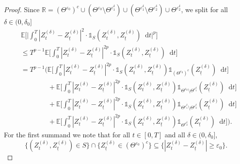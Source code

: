 \documentclass[11pt,a4paper]{article}
\numberwithin{equation}{section}
\theoremstyle{definition}
\newcommand{\E}{{\mathbb{E}}}
\newcommand{\R}{{\mathbb{R}}}
\newcommand{\diff}{\mathop{}\!\mathrm{d}}
\begin{document}
\begin{proof}
    Since $\R = (\Theta^{\varepsilon_0})^c \cup (\Theta^{\varepsilon_0}\setminus \Theta^{\varepsilon_1^\delta}) \cup (\Theta^{\varepsilon_1^\delta}\setminus \Theta^{\varepsilon_2^\delta}) \cup \Theta^{\varepsilon_2^\delta}$, we split for all $\delta\in(0,\delta_0]$
    \begin{equation}
        \begin{aligned}
            &\E\Big[\Big|\int_0^T |Z_{t}^{(\delta)} - Z_{\underline t}^{(\delta)}|^2\cdot \mathds{1}_{S}(Z_{t}^{(\delta)},Z_{\underline t}^{(\delta)}) \diff t \Big|^p\Big]\\
            & \leq T^{p-1}\E\Big[\int_0^T  |Z_{t}^{(\delta)} - Z_{\underline t}^{(\delta)}|^{2p}\cdot \mathds{1}_{S}(Z_{t}^{(\delta)},Z_{\underline t}^{(\delta)}) \diff t \Big]\\
            &= T^{p-1} \Big( \E\Big[\int_0^T  |Z_{t}^{(\delta)} - Z_{\underline t}^{(\delta)}|^{2p}\cdot \mathds{1}_{S}(Z_{t}^{(\delta)},Z_{\underline t}^{(\delta)}) \mathds{1}_{(\Theta^{\varepsilon_0})^c}(Z_{\underline t}^{(\delta)}) \diff t \Big] \\
            &\quad\quad\quad\quad+ \E\Big[\int_0^T  |Z_{t}^{(\delta)} - Z_{\underline t}^{(\delta)}|^{2p}\cdot \mathds{1}_{S}(Z_{t}^{(\delta)},Z_{\underline t}^{(\delta)}) \mathds{1}_{\Theta^{\varepsilon_0}\setminus \Theta^{\varepsilon_1^\delta}}(Z_{\underline t}^{(\delta)}) \diff t \Big]\\
            &\quad\quad\quad\quad + \E\Big[\int_0^T  |Z_{t}^{(\delta)} - Z_{\underline t}^{(\delta)}|^{2p}\cdot \mathds{1}_{S}(Z_{t}^{(\delta)},Z_{\underline t}^{(\delta)}) \mathds{1}_{\Theta^{\varepsilon_1^\delta}\setminus \Theta^{\varepsilon_2^\delta}}(Z_{\underline t}^{(\delta)}) \diff t \Big]\\
            &\quad\quad\quad\quad+ \E\Big[\int_0^T  |Z_{t}^{(\delta)} - Z_{\underline t}^{(\delta)}|^{2p}\cdot \mathds{1}_{S}(Z_{t}^{(\delta)},Z_{\underline t}^{(\delta)}) \mathds{1}_{\Theta^{\varepsilon_2^\delta}}(Z_{\underline t}^{(\delta)}) \diff t \Big]\Big).
        \end{aligned} 
    \end{equation}
    For the first summand we note that for all $t\in[0,T]$ and all $\delta\in(0,\delta_0]$,
    \begin{equation}
        \{(Z_{t}^{(\delta)}, Z_{\underline t}^{(\delta)})\in S\}\cap \{Z_{\underline t}^{(\delta)} \in (\Theta^{\varepsilon_0})^c\}\subseteq \{|Z_{t}^{(\delta)}- Z_{\underline t}^{(\delta)}|\geq \varepsilon_0\}.
    \end{equation}

\end{proof}
\end{document}
